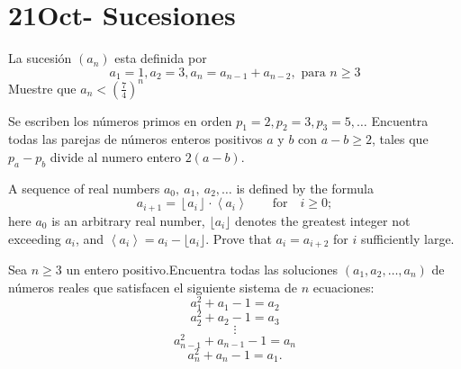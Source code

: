 \documentclass[11pt]{scrartcl}
\begin{document}
\newpage

\section{21Oct- Sucesiones }

\begin{problem} %
    La sucesión $(a_n)$ esta definida por
    \[ a_1=1, a_2=3, a_n=a_{n-1}+a_{n-2}, \text{ para } n\geq 3\]
    Muestre que $a_n < \left( \frac{7}{4} \right)^n $
\end{problem}


\begin{problem} %
Se escriben los números primos en orden $p_1=2, p_2=3, p_3=5,\ldots$ Encuentra todas las parejas de números enteros positivos $a$ y $b$ con $a-b\geq 2$, tales que $p_a-p_b$ divide al numero entero $2(a-b)$.
\end{problem}


\begin{problem} %
    A sequence of real numbers $ a_{0},\ a_{1},\ a_{2},\dots$ is defined by the formula
\[ a_{i + 1} = \left\lfloor a_{i}\right\rfloor\cdot \left\langle a_{i}\right\rangle\qquad\text{for}\quad i\geq 0;
\]here $a_0$ is an arbitrary real number, $\lfloor a_i\rfloor$ denotes the greatest integer not exceeding $a_i$, and $\left\langle a_i\right\rangle=a_i-\lfloor a_i\rfloor$. Prove that $a_i=a_{i+2}$ for $i$ sufficiently large.
    
\end{problem}


\begin{problem} %
Sea $n\geq 3$ un entero positivo.Encuentra todas las soluciones $(a_1,a_2,\ldots,a_n)$ de números reales que satisfacen el siguiente sistema de $n$ ecuaciones:
$$a_1^2+a_1-1=a_2$$
$$a_2^2+a_2-1=a_3$$
$$\vdots$$
$$a_{n-1}^2+a_{n-1}-1=a_n$$
$$a_n^2+a_n-1=a_1.$$
\end{problem}
\end{document}
